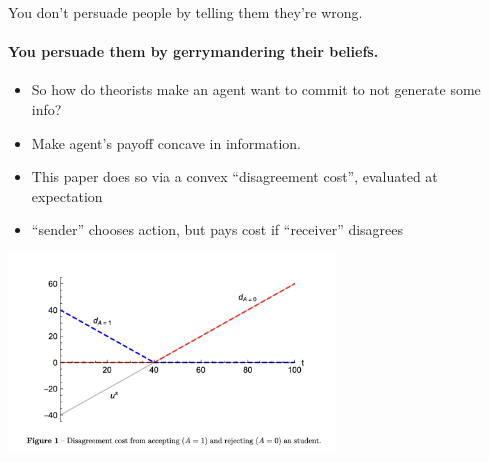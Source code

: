 \documentclass[11pt, aspectratio=169]{beamer}
\theoremstyle{plain}
\theoremstyle{plain}
\theoremstyle{plain}
\theoremstyle{plain}
\begin{document}
\begin{frame}{You don't persuade people by telling them they're wrong.}\framesubtitle{You persuade them by gerrymandering their beliefs.}
    \begin{itemize}
        \pause
        \item So how do theorists make an agent want to commit to not generate some info? \pause
        \item  Make agent's payoff concave in information. \pause
    \item This paper does so via a convex ``disagreement cost'', evaluated at expectation \pause
    \item``sender'' chooses action, but pays cost if ``receiver'' disagrees \pause

\end{itemize}
\begin{center} \includegraphics[width=0.65\textwidth]{testoptional-fig1.png} \end{center}
\end{frame}






    
\end{document}
